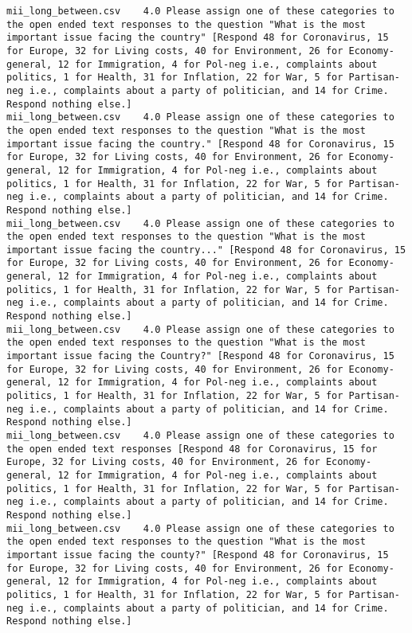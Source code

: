 \begin{lstlisting}[label=lst:promptvariants]
mii_long_between.csv	4.0	Please assign one of these categories to the open ended text responses to the question "What is the most important issue facing the country" [Respond 48 for Coronavirus, 15 for Europe, 32 for Living costs, 40 for Environment, 26 for Economy-general, 12 for Immigration, 4 for Pol-neg i.e., complaints about politics, 1 for Health, 31 for Inflation, 22 for War, 5 for Partisan-neg i.e., complaints about a party of politician, and 14 for Crime. Respond nothing else.]
mii_long_between.csv	4.0	Please assign one of these categories to the open ended text responses to the question "What is the most important issue facing the country." [Respond 48 for Coronavirus, 15 for Europe, 32 for Living costs, 40 for Environment, 26 for Economy-general, 12 for Immigration, 4 for Pol-neg i.e., complaints about politics, 1 for Health, 31 for Inflation, 22 for War, 5 for Partisan-neg i.e., complaints about a party of politician, and 14 for Crime. Respond nothing else.]
mii_long_between.csv	4.0	Please assign one of these categories to the open ended text responses to the question "What is the most important issue facing the country..." [Respond 48 for Coronavirus, 15 for Europe, 32 for Living costs, 40 for Environment, 26 for Economy-general, 12 for Immigration, 4 for Pol-neg i.e., complaints about politics, 1 for Health, 31 for Inflation, 22 for War, 5 for Partisan-neg i.e., complaints about a party of politician, and 14 for Crime. Respond nothing else.]
mii_long_between.csv	4.0	Please assign one of these categories to the open ended text responses to the question "What is the most important issue facing the Country?" [Respond 48 for Coronavirus, 15 for Europe, 32 for Living costs, 40 for Environment, 26 for Economy-general, 12 for Immigration, 4 for Pol-neg i.e., complaints about politics, 1 for Health, 31 for Inflation, 22 for War, 5 for Partisan-neg i.e., complaints about a party of politician, and 14 for Crime. Respond nothing else.]
mii_long_between.csv	4.0	Please assign one of these categories to the open ended text responses [Respond 48 for Coronavirus, 15 for Europe, 32 for Living costs, 40 for Environment, 26 for Economy-general, 12 for Immigration, 4 for Pol-neg i.e., complaints about politics, 1 for Health, 31 for Inflation, 22 for War, 5 for Partisan-neg i.e., complaints about a party of politician, and 14 for Crime. Respond nothing else.]
mii_long_between.csv	4.0	Please assign one of these categories to the open ended text responses to the question "What is the most important issue facing the county?" [Respond 48 for Coronavirus, 15 for Europe, 32 for Living costs, 40 for Environment, 26 for Economy-general, 12 for Immigration, 4 for Pol-neg i.e., complaints about politics, 1 for Health, 31 for Inflation, 22 for War, 5 for Partisan-neg i.e., complaints about a party of politician, and 14 for Crime. Respond nothing else.]

\end{lstlisting}
